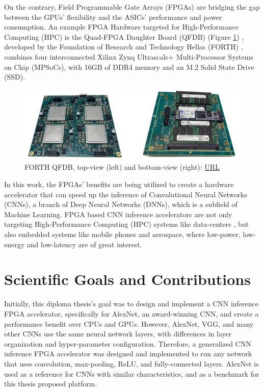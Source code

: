 On the contrary, Field Programmable Gate Arrays (FPGAs) are bridging the gap between the GPUs' flexibility and the ASICs' performance and power consumption. An example FPGA Hardware targeted for High-Performance Computing (HPC) is the Quad-FPGA Daughter Board (QFDB) (Figure \ref{fig:forth-qfdb-daughterboard}) \cite{Implementation-and-Impact-of-an-Ultra-Compact-Multi-FPGA-Board-for-Large-System-Prototyping}, developed by the Foundation of Research and Technology Hellas (FORTH) \cite{FORTH}, combines four interconnected Xilinx Zynq Ultrascale+ Multi-Processor Systems on Chip (MPSoCs), with 16GB of DDR4 memory and an M.2 Solid State Drive (SSD).

\begin{figure} [H]
	\centering
	\includegraphics[scale=0.22]{Images/Hardware/QFDB.png}
	\decoRule
	\caption[FORTH QFDB]{FORTH QFDB, top-view (left) and bottom-view (right): \href{https://ieeexplore.ieee.org/stamp/stamp.jsp?arnumber=8945720}{URL}}
	\label{fig:forth-qfdb-daughterboard}
\end{figure}

In this work, the FPGAs' benefits are being utilized to create a hardware accelerator that can speed up the inference of Convolutional Neural Networks (CNNs), a branch of Deep Neural Networks (DNNs), which is a subfield of Machine Learning. FPGA based CNN inference accelerators are not only targeting High-Performance Computing (HPC) systems like data-centers \cite{CNN-based-high-performance-computing-for-real-time-image-processing-on-GPU}, but also embedded systems \cite{MobileNets-Efficient-Convolutional-Neural-Networks-for-Mobile-Vision-Applications} like mobile phones and aerospace, where low-power, low-energy and low-latency are of great interest.

\section{Scientific Goals and Contributions}
Initially, this diploma thesis's goal was to design and implement a CNN inference FPGA accelerator, specifically for AlexNet, an award-winning CNN, and create a performance benefit over CPUs and GPUs. However, AlexNet, VGG, and many other CNNs use the same neural network layers, with differences in layer organization and hyper-parameter configuration. Therefore, a generalized CNN inference FPGA accelerator was designed and implemented to run any network that uses convolution, max-pooling, ReLU, and fully-connected layers. AlexNet is used as a reference for CNNs with similar characteristics, and as a benchmark for this thesis proposed platform.

